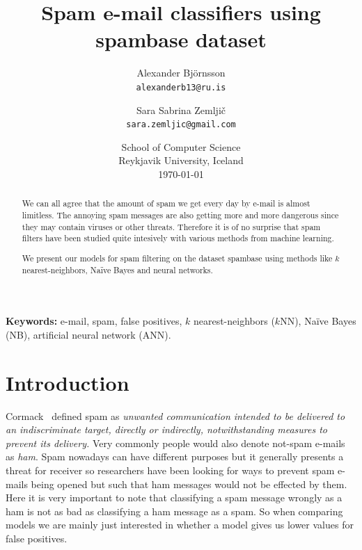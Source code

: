 \documentclass[11pt,a4paper]{article}
\begin{document}
\title{\textbf{Spam e-mail classifiers using spambase dataset}}

\author{
	Alexander Bj\"ornsson\\
	{\tt alexanderb13@ru.is}
\and
	Sara Sabrina Zemlji\v c \\
	{\tt sara.zemljic@gmail.com}
}

\date{{\small School of Computer Science\\ Reykjavik University, Iceland}\\
\medskip
{\small \today}}
\maketitle

\begin{abstract}
We can all agree that the amount of spam we get every day by e-mail is almost limitless. The annoying spam messages are also getting more and more dangerous since they may contain viruses or other threats. Therefore it is of no surprise that spam filters have been studied quite intesively with various methods from machine learning.

We present our models for spam filtering on the dataset spambase using methods like $k$ nearest-neighbors, Na\"ive Bayes and neural networks.
\end{abstract}

\medskip
\textbf{Keywords:} e-mail, spam, false positives, $k$ nearest-neighbors ($k$NN), Na\"ive Bayes (NB), artificial neural network (ANN).
\medskip

\section{Introduction}

Cormack~\cite[p.2]{Cormack-2006} defined spam as \textit{unwanted communication intended to be delivered to an indiscriminate target, directly or indirectly, notwithstanding measures to prevent its delivery.} Very commonly people would also denote not-spam e-mails as {\em ham}.
Spam nowadays can have different purposes but it generally presents a threat for receiver so researchers have been looking for ways to prevent spam e-mails being opened but such that ham messages would not be effected by them. 
Here it is very important to note that classifying a spam message wrongly as a ham is not as bad as classifying a ham message as a spam. So when comparing models we are mainly just interested in whether a model gives us lower values for false positives.
\end{document}
